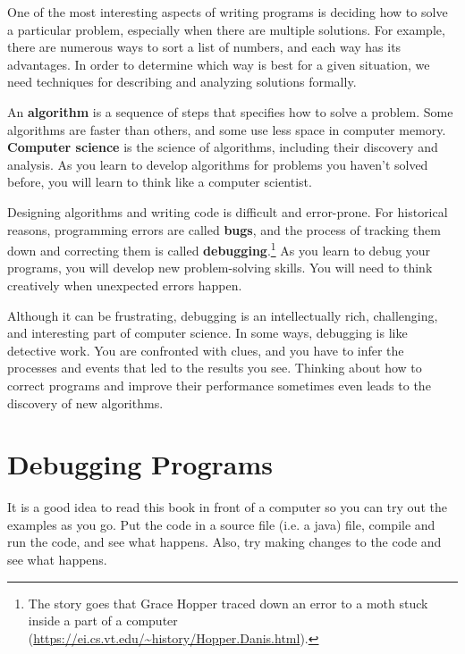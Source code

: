 One of the most interesting aspects of writing programs is deciding how to solve a particular problem, especially when there are multiple solutions.
For example, there are numerous ways to sort a list of numbers, and each way has its advantages.
In order to determine which way is best for a given situation, we need techniques for describing and analyzing solutions formally.


An {\bf algorithm} is a sequence of steps that specifies how to solve a problem.
Some algorithms are faster than others, and some use less space in computer memory.
{\bf Computer science} is the science of algorithms, including their discovery and analysis.
As you learn to develop algorithms for problems you haven't solved before, you will learn to think like a computer scientist.


Designing algorithms and writing code is difficult and error-prone.
For historical reasons, programming errors are called {\bf bugs}, and the process of tracking them down and correcting them is called {\bf debugging}.\footnote{The story goes that Grace Hopper traced down an error to a moth stuck inside a part of a computer (\url{https://ei.cs.vt.edu/~history/Hopper.Danis.html}).}
As you learn to debug your programs, you will develop new problem-solving skills.
You will need to think creatively when unexpected errors happen.

Although it can be frustrating, debugging is an intellectually rich, challenging, and interesting part of computer science.
In some ways, debugging is like detective work.
You are confronted with clues, and you have to infer the processes and events that led to the results you see.
Thinking about how to correct programs and improve their performance sometimes even leads to the discovery of new algorithms.


\section{Debugging Programs}
\label{sec:examples}

It is a good idea to read this book in front of a computer so you can try out the examples as you go.
Put the code in a source file (i.e. a java) file, compile and run the code, and see what happens.
Also, try making changes to the code and see what happens.

